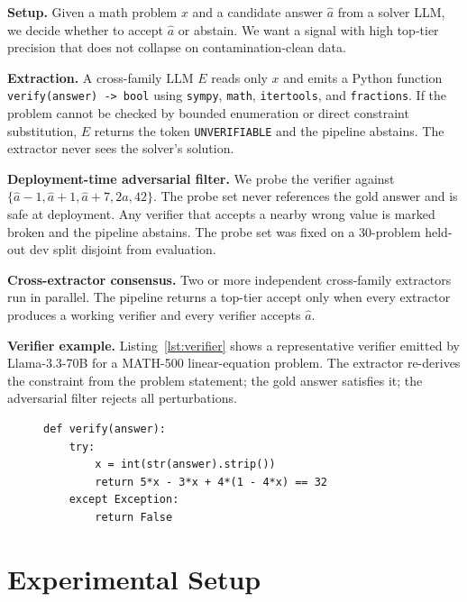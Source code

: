 \documentclass{article}
\begin{document}
\textbf{Setup.} Given a math problem $x$ and a candidate answer $\hat a$ from a solver LLM, we decide whether to accept $\hat a$ or abstain. We want a signal with high top-tier precision that does not collapse on contamination-clean data.

\textbf{Extraction.} A cross-family LLM $E$ reads only $x$ and emits a Python function \texttt{verify(answer) -> bool} using \texttt{sympy}, \texttt{math}, \texttt{itertools}, and \texttt{fractions}. If the problem cannot be checked by bounded enumeration or direct constraint substitution, $E$ returns the token \texttt{UNVERIFIABLE} and the pipeline abstains. The extractor never sees the solver's solution.

\textbf{Deployment-time adversarial filter.} We probe the verifier against $\{\hat a{-}1, \hat a{+}1, \hat a{+}7, 2\hat a, 42\}$. The probe set never references the gold answer and is safe at deployment. Any verifier that accepts a nearby wrong value is marked broken and the pipeline abstains. The probe set was fixed on a 30-problem held-out dev split disjoint from evaluation.

\textbf{Cross-extractor consensus.} Two or more independent cross-family extractors run in parallel. The pipeline returns a top-tier accept only when every extractor produces a working verifier and every verifier accepts $\hat a$.

\textbf{Verifier example.} Listing~\ref{lst:verifier} shows a representative verifier emitted by Llama-3.3-70B for a MATH-500 linear-equation problem. The extractor re-derives the constraint from the problem statement; the gold answer satisfies it; the adversarial filter rejects all perturbations.

\begin{figure}[t]
\begin{lstlisting}[style=xsgrv,caption={Representative X-SGRV verifier emitted by Llama-3.3-70B for a MATH-500 linear-equation problem.},label={lst:verifier}]
def verify(answer):
    try:
        x = int(str(answer).strip())
        return 5*x - 3*x + 4*(1 - 4*x) == 32
    except Exception:
        return False
\end{lstlisting}
\end{figure}

\section{Experimental Setup}
\end{document}
